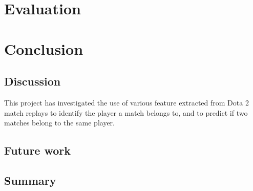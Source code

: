 \documentclass[Report.tex]{subfiles}
\begin{document}
\section{Evaluation}


\section{Conclusion}

\subsection{Discussion}
This project has investigated the use of various feature extracted from Dota 2 match replays to identify the player a match belongs to, and to predict if two matches belong to the same player. 





\subsection{Future work}




\subsection{Summary}
\end{document}
